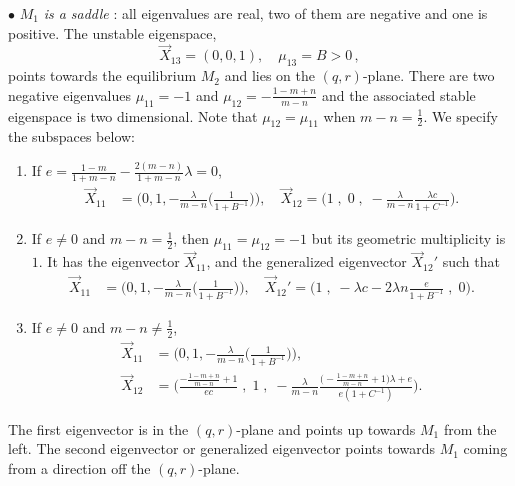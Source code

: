 \documentclass[a4paper,11pt]{article}
\numberwithin{step}{dummy}
\begin{document}
$\bullet$ $M_1$ \emph{is a saddle }: all eigenvalues are real, two of them are negative and one is positive. The unstable eigenspace,
$$  \vec{X}_{13} = (0, 0, 1), \quad \mu_{13}= B > 0 \, , $$
points towards the equilibrium $M_2$ and lies on the $(q,r)$-plane. 
There are two negative eigenvalues $\mu_{11}=-1$ and $\mu_{12}=- \frac{1-m+n}{m-n}$ and  the associated stable eigenspace  is two dimensional. 
Note that  $\mu_{12} = \mu_{11}$ when $m-n= \frac{1}{2}$. We specify the subspaces below:
\begin{enumerate}
 \item If $e=\frac{1-m}{1+m-n} - \frac{2(m-n)}{1+m-n}\lambda =0$, 
 \begin{align*} 
  \vec{X}_{11} &= \Bigg( 0, 1, - \frac{\lambda}{m-n} \bigg(\frac{1}{1+ B^{-1}} \bigg)\Bigg), \quad
  \vec{X}_{12} = 
\bigg(  1\;,\;0\;,\;  -\frac{\lambda}{m-n} \frac{\lambda c}{1+C^{-1}}\bigg).
  \end{align*}
  \item If $e\ne0$ and $m-n = \frac{1}{2}$, then $\mu_{11}=\mu_{12}=-1$ but its geometric multiplicity is $1$. It has the eigenvector $\vec{X}_{11}$, and the generalized eigenvector $\vec{X}_{12}'$ such that
  \begin{align*} 
  \vec{X}_{11} &= \Bigg( 0, 1, - \frac{\lambda}{m-n} \bigg(\frac{1}{1+ B^{-1}} \bigg)\Bigg), \quad 
  \vec{X}_{12}'= \Bigg(1 \;,\; -\lambda c - 2\lambda n \frac{e}{1+B^{-1}} \;,\; 0\Bigg).
  \end{align*}
  \item If $e\ne0$ and $m-n \ne \frac{1}{2}$,
  \begin{align*} 
  \vec{X}_{11} &= \Bigg( 0, 1, - \frac{\lambda}{m-n} \bigg(\frac{1}{1+ B^{-1}} \bigg)\Bigg), \\
  \vec{X}_{12} &= \Bigg(  \frac{-\frac{1-m+n}{m-n}+1}{ec}\;,\;1\;,\; -\frac{\lambda}{m-n}\frac{\big(-\frac{1-m+n}{m-n}+1\big)\lambda + e}{e(1+C^{-1})}\Bigg).
  \end{align*}
\end{enumerate}
The first eigenvector is in the $(q,r)$-plane and points up towards $M_1$ from the left. 
The second eigenvector or generalized eigenvector points towards $M_1$ coming from a direction off the $(q,r)$-plane. 
\end{document}
